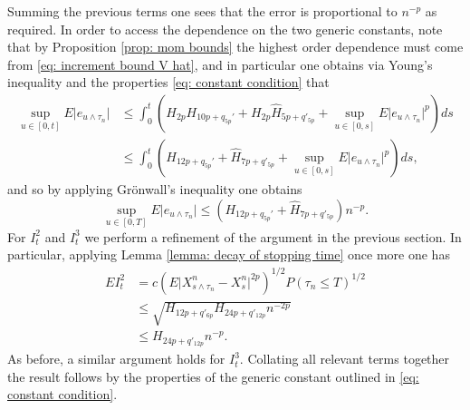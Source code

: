 \documentclass{article}
\begin{document}
Summing the previous terms one sees that the error is proportional to $n^{-p}$ as required. In order to access the dependence on the two generic constants, note that by Proposition \ref{prop: mom bounds} the highest order dependence must come from \eqref{eq: increment bound V hat}, and in particular one obtains via Young's inequality and the properties \eqref{eq: constant condition} that
\begin{align}
    \sup_{u\in [0,t]}E\lvert e_{u\wedge \tau_n}\rvert &\leq \int^t_0 (H_{2p}H_{10p+q_{5p}'}+H_{2p}\hat{H}_{5p+q'_{5p}}+\sup_{u\in[0,s]}E\lvert e_{u\wedge \tau_n}\rvert^p)ds \nonumber \\
    &\leq \int^t_0 (H_{12p+q_{5p}'}+\hat{H}_{7p+q'_{5p}}+\sup_{u\in[0,s]}E\lvert e_{u\wedge \tau_n}\rvert^p)ds,
\end{align}
and so by applying Grönwall's inequality one obtains
\begin{equation}
    \sup_{u\in [0,T]}E\lvert e_{u\wedge \tau_n} \rvert\leq (H_{12p+q_{5p}'}+\hat{H}_{7p+q'_{5p}})n^{-p}.
\end{equation}
For $I^2_t$ and $I^3_t$ we perform a refinement of the argument in the previous section. In particular, applying Lemma \ref{lemma: decay of stopping time} once more one has
    \begin{align}
        EI^2_t&=c(E\lvert X^n_{s\wedge \tau_n}-X^n_s\rvert^{2p})^{1/2}P(
        \tau_n\leq T)^{1/2}\nonumber \\
        &\leq \sqrt{H_{12p+q'_{6p}}H_{24p+q'_{12p}}n^{-2p}}\nonumber \\
        &\leq H_{24p+q'_{12p}}n^{-p}.
    \end{align}
    As before, a similar argument holds for $I^3_t$. Collating all relevant terms together the result follows by the properties of the generic constant outlined in \eqref{eq: constant condition}.
\end{document}
